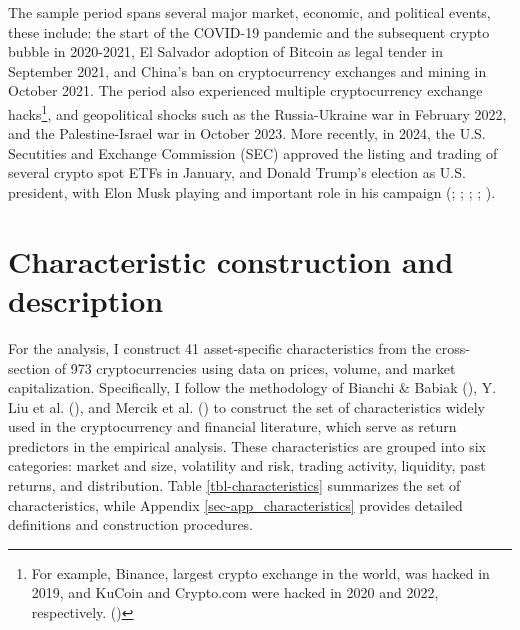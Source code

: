 \documentclass[
  12pt,
  a4paper,
  openany]{scrbook}
\begin{document}
The sample period spans several major market, economic, and political
events, these include: the start of the COVID-19 pandemic and the
subsequent crypto bubble in 2020-2021, El Salvador adoption of Bitcoin
as legal tender in September 2021, and China's ban on cryptocurrency
exchanges and mining in October 2021. The period also experienced
multiple cryptocurrency exchange hacks\footnote{For example, Binance,
  largest crypto exchange in the world, was hacked in 2019, and KuCoin
  and Crypto.com were hacked in 2020 and 2022, respectively.
  ()}, and
geopolitical shocks such as the Russia-Ukraine war in February 2022, and
the Palestine-Israel war in October 2023. More recently, in 2024, the
U.S. Secutities and Exchange Commission (SEC) approved the listing and
trading of several crypto spot ETFs in January, and Donald Trump's
election as U.S. president, with Elon Musk playing and important role in
his campaign
(; ;
;
; ).

\section{Characteristic construction and
description}\label{sec-characteristics}

For the analysis, I construct 41 asset-specific characteristics from the
cross-section of 973 cryptocurrencies using data on prices, volume, and
market capitalization. Specifically, I follow the methodology of Bianchi
\& Babiak (),
Y. Liu et al. (), and Mercik et
al.
()
to construct the set of characteristics widely used in the
cryptocurrency and financial literature, which serve as return
predictors in the empirical analysis. These characteristics are grouped
into six categories: market and size, volatility and risk, trading
activity, liquidity, past returns, and distribution. Table
\ref{tbl-characteristics} summarizes the set of characteristics, while
Appendix \ref{sec-app_characteristics} provides detailed definitions and
construction procedures.
\end{document}
